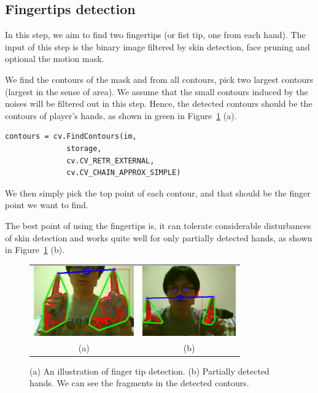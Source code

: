 \documentclass[10pt,twocolumn,letterpaper]{article}
\begin{document}
\subsection{Fingertips detection}
In this step, we aim to find two fingertips (or fist tip, 
one from each hand). The input of this step is the binary image 
filtered by skin detection, face pruning and optional the motion mask.

We find the contours of the mask and from all contours, pick 
two largest contours (largest in the sense of area). 
We assume that the small contours induced by the noises will be 
filtered out in this step. Hence, the detected contours should 
be the contours of player's hands, as shown in green in Figure~\ref{fig:fingertip} (a).

\begin{verbatim}
contours = cv.FindContours(im,
              storage,
              cv.CV_RETR_EXTERNAL,
              cv.CV_CHAIN_APPROX_SIMPLE)
\end{verbatim}

We then simply pick the top point of each contour, and that 
should be the finger point we want to find.

The best point of using the fingertips is, it can tolerate 
considerable disturbances of skin detection and works quite 
well for only partially detected hands, as shown in Figure~\ref{fig:fingertip} (b).

\begin{figure}[h]
\centering
\begin{tabular}{cc}
\includegraphics[height=3cm]{fingertip.png} &
\includegraphics[height=3cm]{partialhand.png} \\
(a) &
(b) 
\end{tabular}
\caption{(a) An illustration of finger tip detection. (b) 
Partially detected hands. We can see the fragments in the 
detected contours.
}
\label{fig:fingertip}
\end{figure}
\end{document}
